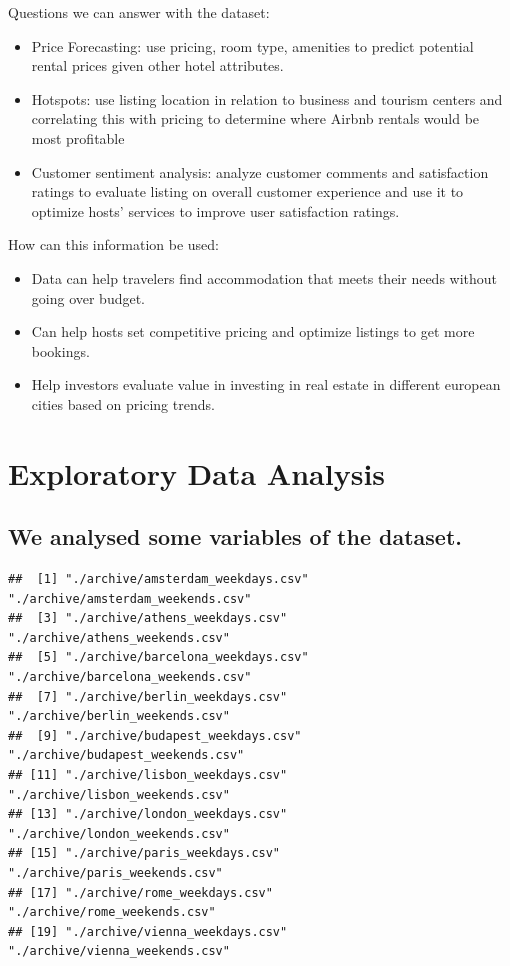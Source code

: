\documentclass[
]{article}
\providecommand{\tightlist}{%
  \setlength{\itemsep}{0pt}\setlength{\parskip}{0pt}}
\begin{document}
Questions we can answer with the dataset:

\begin{itemize}
\tightlist
\item
  Price Forecasting: use pricing, room type, amenities to predict
  potential rental prices given other hotel attributes.
\item
  Hotspots: use listing location in relation to business and tourism
  centers and correlating this with pricing to determine where Airbnb
  rentals would be most profitable
\item
  Customer sentiment analysis: analyze customer comments and
  satisfaction ratings to evaluate listing on overall customer
  experience and use it to optimize hosts' services to improve user
  satisfaction ratings.
\end{itemize}

How can this information be used:

\begin{itemize}
\tightlist
\item
  Data can help travelers find accommodation that meets their needs
  without going over budget.
\item
  Can help hosts set competitive pricing and optimize listings to get
  more bookings.
\item
  Help investors evaluate value in investing in real estate in different
  european cities based on pricing trends.
\end{itemize}

\hypertarget{exploratory-data-analysis}{%
\section{Exploratory Data Analysis}\label{exploratory-data-analysis}}

\hypertarget{we-analysed-some-variables-of-the-dataset.}{%
\subsection{We analysed some variables of the
dataset.}\label{we-analysed-some-variables-of-the-dataset.}}

\begin{verbatim}
##  [1] "./archive/amsterdam_weekdays.csv" "./archive/amsterdam_weekends.csv"
##  [3] "./archive/athens_weekdays.csv"    "./archive/athens_weekends.csv"   
##  [5] "./archive/barcelona_weekdays.csv" "./archive/barcelona_weekends.csv"
##  [7] "./archive/berlin_weekdays.csv"    "./archive/berlin_weekends.csv"   
##  [9] "./archive/budapest_weekdays.csv"  "./archive/budapest_weekends.csv" 
## [11] "./archive/lisbon_weekdays.csv"    "./archive/lisbon_weekends.csv"   
## [13] "./archive/london_weekdays.csv"    "./archive/london_weekends.csv"   
## [15] "./archive/paris_weekdays.csv"     "./archive/paris_weekends.csv"    
## [17] "./archive/rome_weekdays.csv"      "./archive/rome_weekends.csv"     
## [19] "./archive/vienna_weekdays.csv"    "./archive/vienna_weekends.csv"
\end{verbatim}
\end{document}
